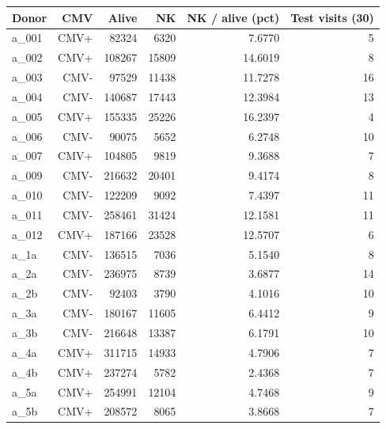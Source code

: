 \begin{tabular}{lrrrrr}
\toprule
Donor & CMV & Alive & NK & NK / alive (pct) & Test visits (30) \\
\midrule
a\_001 & CMV+ & 82324 & 6320 & 7.6770 & 5 \\
a\_002 & CMV+ & 108267 & 15809 & 14.6019 & 8 \\
a\_003 & CMV- & 97529 & 11438 & 11.7278 & 16 \\
a\_004 & CMV- & 140687 & 17443 & 12.3984 & 13 \\
a\_005 & CMV+ & 155335 & 25226 & 16.2397 & 4 \\
a\_006 & CMV- & 90075 & 5652 & 6.2748 & 10 \\
a\_007 & CMV+ & 104805 & 9819 & 9.3688 & 7 \\
a\_009 & CMV- & 216632 & 20401 & 9.4174 & 8 \\
a\_010 & CMV- & 122209 & 9092 & 7.4397 & 11 \\
a\_011 & CMV- & 258461 & 31424 & 12.1581 & 11 \\
a\_012 & CMV+ & 187166 & 23528 & 12.5707 & 6 \\
a\_1a & CMV- & 136515 & 7036 & 5.1540 & 8 \\
a\_2a & CMV- & 236975 & 8739 & 3.6877 & 14 \\
a\_2b & CMV- & 92403 & 3790 & 4.1016 & 10 \\
a\_3a & CMV- & 180167 & 11605 & 6.4412 & 9 \\
a\_3b & CMV- & 216648 & 13387 & 6.1791 & 10 \\
a\_4a & CMV+ & 311715 & 14933 & 4.7906 & 7 \\
a\_4b & CMV+ & 237274 & 5782 & 2.4368 & 7 \\
a\_5a & CMV+ & 254991 & 12104 & 4.7468 & 9 \\
a\_5b & CMV+ & 208572 & 8065 & 3.8668 & 7 \\
\bottomrule
\end{tabular}
